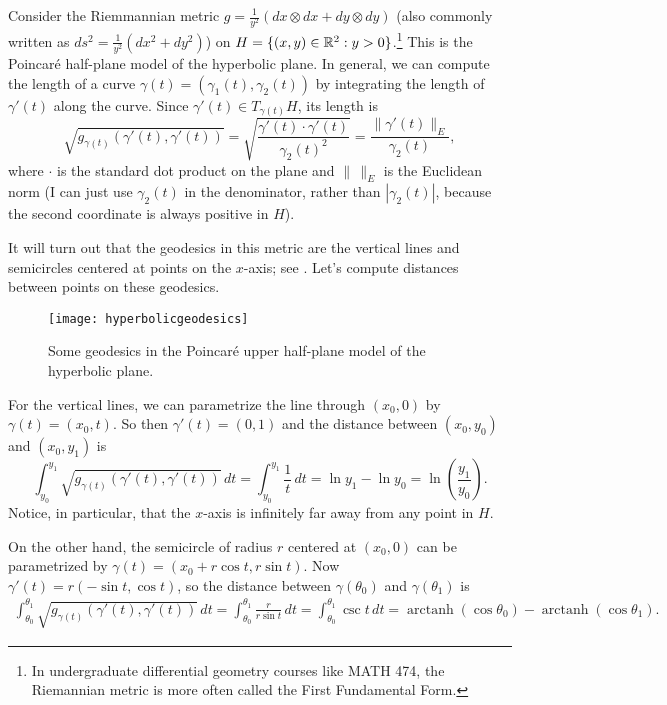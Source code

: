 \begin{example}
	Consider the Riemmannian metric $g = \frac{1}{y^2}(dx \otimes dx + dy \otimes dy)$ (also commonly written as $ds^2 = \frac{1}{y^2}(dx^2 + dy^2)$) on $H = \{(x,y) \in \mathbb{R}^2 : y > 0\}$.\footnote{In undergraduate differential geometry courses like MATH 474, the Riemannian metric is more often called the First Fundamental Form.} This is the Poincaré half-plane model of the hyperbolic plane. In general, we can compute the length of a curve $\gamma(t) = (\gamma_1(t),\gamma_2(t))$ by integrating the length of $\gamma'(t)$ along the curve. Since $\gamma'(t) \in T_{\gamma(t)}H$, its length is 
	\[
		\sqrt{g_{\gamma(t)}(\gamma'(t),\gamma'(t))} = \sqrt{\frac{\gamma'(t) \cdot \gamma'(t)}{\gamma_2(t)^2}} = \frac{\|\gamma'(t)\|_E}{\gamma_2(t)},
	\] 
	where $\cdot$ is the standard dot product on the plane and $\| \, \|_E$ is the Euclidean norm (I can just use $\gamma_2(t)$ in the denominator, rather than $|\gamma_2(t)|$, because the second coordinate is always positive in $H$).
	
	It will turn out that the geodesics in this metric are the vertical lines and semicircles centered at points on the $x$-axis; see . Let's compute distances between points on these geodesics.
	
	\begin{figure}[htbp]
		\centering
			\texttt{[image: hyperbolicgeodesics]}
		\caption{Some geodesics in the Poincaré upper half-plane model of the hyperbolic plane.}
		\label{fig:hyperbolicgeodesics}
	\end{figure}
	
	For the vertical lines, we can parametrize the line through $(x_0,0)$ by $\gamma(t) = (x_0,t)$. So then $\gamma'(t) = (0,1)$ and the distance between $(x_0,y_0)$ and $(x_0,y_1)$ is
	\[
		\int_{y_0}^{y_1} \sqrt{g_{\gamma(t)}(\gamma'(t),\gamma'(t))}\,dt = \int_{y_0}^{y_1} \frac{1}{t}\, dt = \ln {y_1} - \ln {y_0} = \ln \left(\frac{y_1}{y_0}\right).
	\]
	Notice, in particular, that the $x$-axis is infinitely far away from any point in $H$.
	
	On the other hand, the semicircle of radius $r$ centered at $(x_0,0)$ can be parametrized by $\gamma(t) = (x_0 + r \cos t, r \sin t)$. Now $\gamma'(t) = r(-\sin t, \cos t)$, so the distance between $\gamma(\theta_0)$ and $\gamma(\theta_1)$ is
	\begin{multline*}
		\int_{\theta_0}^{\theta_1} \sqrt{g_{\gamma(t)}(\gamma'(t),\gamma'(t))}\, dt = \int_{\theta_0}^{\theta_1} \frac{r}{r \sin t} \, dt = \int_{\theta_0}^{\theta_1} \csc t\, dt = \operatorname{arctanh}(\cos\theta_0) - \operatorname{arctanh}(\cos \theta_1).
	\end{multline*}
\end{example}